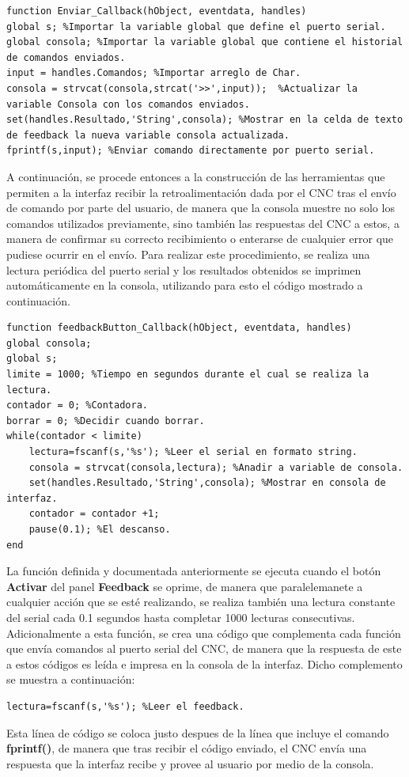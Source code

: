 \documentclass{article}
\begin{document}
\begin{multicols}{2}
\begin{lstlisting}
function Enviar_Callback(hObject, eventdata, handles)
global s; %Importar la variable global que define el puerto serial.
global consola; %Importar la variable global que contiene el historial de comandos enviados.
input = handles.Comandos; %Importar arreglo de Char.
consola = strvcat(consola,strcat('>>',input));  %Actualizar la variable Consola con los comandos enviados.
set(handles.Resultado,'String',consola); %Mostrar en la celda de texto de feedback la nueva variable consola actualizada.
fprintf(s,input); %Enviar comando directamente por puerto serial.
\end{lstlisting}
A continuación, se procede entonces a la construcción de las herramientas que permiten a la interfaz recibir la retroalimentación dada por el CNC tras el envío de comando por parte del usuario, de manera que la consola muestre no solo los comandos utilizados previamente, sino también las respuestas del CNC a estos, a manera de confirmar su correcto recibimiento o enterarse de cualquier error que pudiese ocurrir en el envío. Para realizar este procedimiento, se realiza una lectura periódica del puerto serial y los resultados obtenidos se imprimen automáticamente en la consola, utilizando para esto el código mostrado a continuación.
\begin{lstlisting}
function feedbackButton_Callback(hObject, eventdata, handles)
global consola;
global s;
limite = 1000; %Tiempo en segundos durante el cual se realiza la lectura.
contador = 0; %Contadora.
borrar = 0; %Decidir cuando borrar.
while(contador < limite)
    lectura=fscanf(s,'%s'); %Leer el serial en formato string.
    consola = strvcat(consola,lectura); %Anadir a variable de consola.
    set(handles.Resultado,'String',consola); %Mostrar en consola de interfaz.
    contador = contador +1;
    pause(0.1); %El descanso.
end
\end{lstlisting}
La función definida y documentada anteriormente se ejecuta cuando el botón \textbf{Activar} del panel \textbf{Feedback} se oprime, de manera que paralelemanete a cualquier acción que se esté realizando, se realiza también una lectura constante del serial cada 0.1 segundos hasta completar 1000 lecturas consecutivas.  Adicionalmente a esta función, se crea una código que complementa cada función que envía comandos al puerto serial del CNC, de manera que la respuesta de este a estos códigos es leída e impresa en la consola de la interfaz. Dicho complemento se muestra a continuación:
\begin{lstlisting}
lectura=fscanf(s,'%s'); %Leer el feedback.
\end{lstlisting}
Esta línea de código se coloca justo despues de la línea que incluye el comando \textbf{fprintf()}, de manera que tras recibir el código enviado, el CNC envía una respuesta que la interfaz recibe y provee al usuario por medio de la consola.


\end{multicols}
\end{document}

